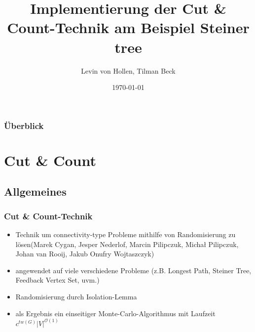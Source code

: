 \documentclass{beamer}
\title[Cut \& Count]{Implementierung der Cut \& Count-Technik am Beispiel Steiner tree} %
\author{
Levin von Hollen, 
Tilman Beck
}
\institute[] %
{
\textit{ \{stu127560-, stu127568-\}@informatik.uni-kiel.de} \\
\medskip
Christian-Albrechts Universität Kiel  %
}
\date{\today} %
\begin{document}
\begin{frame}
\titlepage %
\end{frame}

\begin{frame}
\frametitle{Überblick} %
\tableofcontents %
\end{frame}


\section{Cut \& Count} %
\subsection{Allgemeines}
\begin{frame}
\frametitle{Cut \& Count-Technik}
\begin{itemize}
\item Technik um connectivity-type Probleme mithilfe von Randomisierung zu lösen(Marek Cygan, Jesper Nederlof, Marcin Pilipczuk, Michał Pilipczuk, Johan van Rooij, Jakub Onufry Wojtaszczyk)
\item angewendet auf viele verschiedene Probleme (z.B. Longest Path, Steiner Tree, Feedback Vertex Set, uvm.)
\item Randomisierung durch Isolation-Lemma 
\item als Ergebnis ein einseitiger Monte-Carlo-Algorithmus mit Laufzeit $c^{tw(G)} |V|^{\mathcal{O}(1)}$
\end{itemize}
\end{frame}
\end{document}
